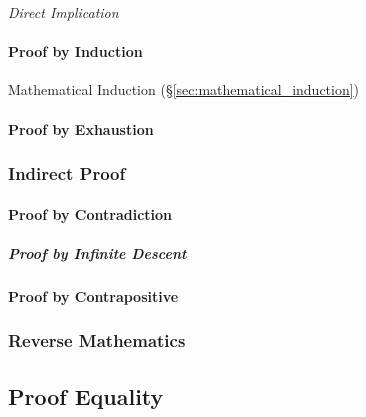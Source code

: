\emph{Direct Implication}



\paragraph{Proof by Induction}\label{sec:induction_proof}\hfill

Mathematical Induction (\S\ref{sec:mathematical_induction})



\paragraph{Proof by Exhaustion}\label{sec:exhaustion_proof}\hfill



\subsubsection{Indirect Proof}\label{sec:indirect_proof}

\paragraph{Proof by Contradiction}\label{sec:contradiction_proof}\hfill

\subparagraph{Proof by Infinite Descent}\label{sec:infinite_descent}\hfill

\paragraph{Proof by Contrapositive}\label{sec:contrapositive_proof}\hfill



\subsubsection{Reverse Mathematics}\label{sec:reverse_mathematics}



\subsection{Proof Equality}\label{sec:proof_equality}
\cite{harper12}

